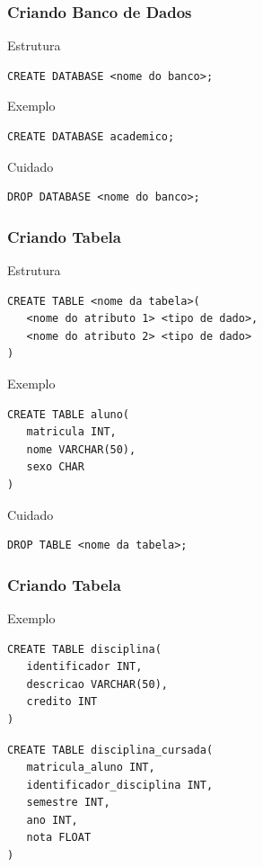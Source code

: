 \documentclass{beamer}
\begin{document}
\begin{frame}[fragile]
\frametitle{Criando Banco de Dados}

\begin{block}{Estrutura}
\begin{lstlisting}
CREATE DATABASE <nome do banco>;
\end{lstlisting}
\end{block}\vfill

\begin{exampleblock}{Exemplo}
\begin{lstlisting}
CREATE DATABASE academico;
\end{lstlisting}
\end{exampleblock}\vfill

\begin{alertblock}{Cuidado}
	\begin{lstlisting}
DROP DATABASE <nome do banco>;
	\end{lstlisting}
\end{alertblock}
\end{frame}

\begin{frame}[fragile]
\frametitle{Criando Tabela}

\begin{block}{Estrutura}
\begin{lstlisting}
CREATE TABLE <nome da tabela>(
   <nome do atributo 1> <tipo de dado>,
   <nome do atributo 2> <tipo de dado>
)
\end{lstlisting}
\end{block}\vfill

\begin{exampleblock}{Exemplo}
\begin{lstlisting}
CREATE TABLE aluno(
   matricula INT,
   nome VARCHAR(50),
   sexo CHAR
)
\end{lstlisting}
\end{exampleblock}\vfill

\begin{alertblock}{Cuidado}
	\begin{lstlisting}
DROP TABLE <nome da tabela>;
	\end{lstlisting}
\end{alertblock}
\end{frame}

\begin{frame}[fragile]
\frametitle{Criando Tabela}

\begin{exampleblock}{Exemplo}
\begin{lstlisting}
CREATE TABLE disciplina(
   identificador INT,
   descricao VARCHAR(50),
   credito INT
)	
\end{lstlisting}\vfill

\begin{lstlisting}
CREATE TABLE disciplina_cursada(
   matricula_aluno INT,
   identificador_disciplina INT,
   semestre INT,
   ano INT,
   nota FLOAT
)	
\end{lstlisting}
\end{exampleblock}
\end{frame}
\end{document}
